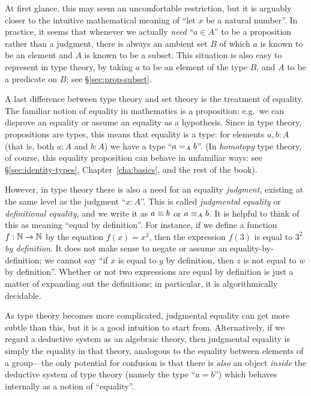 At first glance, this may seem an uncomfortable restriction, but it is arguably closer to the intuitive mathematical meaning of ``let $x$ be a natural number''.
In practice, it seems that whenever we actually \emph{need} ``$a\in A$'' to be a proposition rather than a judgment, there is always an ambient set $B$ of which $a$ is known to be an element and $A$ is known to be a subset.
This situation is also easy to represent in type theory, by taking $a$ to be an element of the type $B$, and $A$ to be a predicate on $B$; see \S\ref{sec:prop-subset}.

A last difference between type theory and set theory is the treatment of equality.
The familiar notion of equality in mathematics is a proposition: e.g.\ we can disprove an equality or assume an equality as a hypothesis.
Since in type theory, propositions are types, this means that equality is a type: for elements $a,b:A$ (that is, both $a:A$ and $b:A$) we have a type ``$\id[A]ab$''.
(In \emph{homotopy} type theory, of course, this equality proposition can behave in unfamiliar ways: see \S\ref{sec:identity-types}, Chapter~\ref{cha:basics}, and the rest of the book).

However, in type theory there is also a need for an equality \emph{judgment}, existing at the same level as the judgment ``$x:A$''.
This is called \emph{judgmental equality} or \emph{definitional equality}, and we write it as $a\jdeq b$ or $a \jdeq_A b$.
It is helpful to think of this as meaning ``equal by definition''.
For instance, if we define a function $f:\nat\to\nat$ by the equation $f(x)=x^2$, then the expression $f(3)$ is equal to $3^2$ \emph{by definition}.
It does not make sense to negate or assume an equality-by-definition; we cannot say ``if $x$ is equal to $y$ by definition, then $z$ is not equal to $w$ by definition''.
Whether or not two expressions are equal by definition is just a matter of expanding out the definitions; in particular, it is algorithmically decidable.

As type theory becomes more complicated, judgmental equality can get more subtle than this, but it is a good intuition to start from.
Alternatively, if we regard a deductive system as an algebraic theory, then judgmental equality is simply the equality in that theory, analogous to the equality between elements of a group---the only potential for confusion is that there is \emph{also} an object \emph{inside} the deductive system of type theory (namely the type ``$a=b$'') which behaves internally as a notion of ``equality''.


